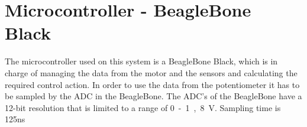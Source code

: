 \section{Microcontroller - BeagleBone Black}

The microcontroller used on this system is a BeagleBone Black, which is in charge of managing the data from the motor and the sensors and calculating the required control action.
In order to use the data from the potentiometer it has to be sampled by the ADC in  the BeagleBone.
The ADC's of the BeagleBone have a 12-bit resolution that is limited to a range of \si{0 - 1,8 V}. Sampling time is 125ns \cite{Cameon}